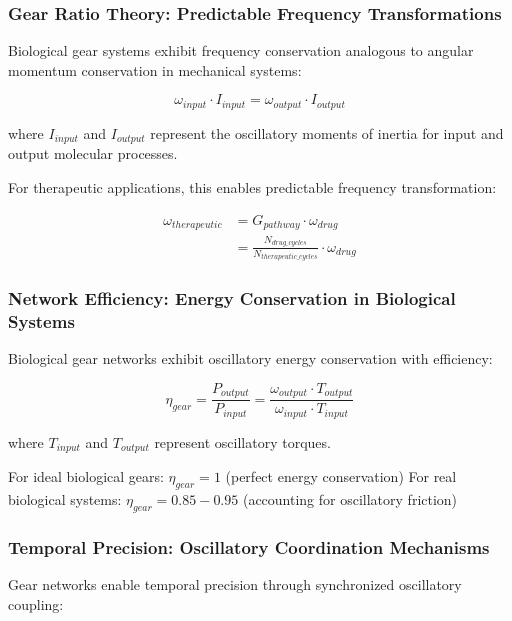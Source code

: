 \documentclass[12pt,a4paper]{article}
\begin{document}
\subsubsection{Gear Ratio Theory: Predictable Frequency Transformations}

Biological gear systems exhibit frequency conservation analogous to angular momentum conservation in mechanical systems:

\begin{equation}
\omega_{input} \cdot I_{input} = \omega_{output} \cdot I_{output}
\end{equation}

where $I_{input}$ and $I_{output}$ represent the oscillatory moments of inertia for input and output molecular processes.

For therapeutic applications, this enables predictable frequency transformation:

\begin{align}
\omega_{therapeutic} &= G_{pathway} \cdot \omega_{drug} \\
&= \frac{N_{drug\_cycles}}{N_{therapeutic\_cycles}} \cdot \omega_{drug}
\end{align}

\subsubsection{Network Efficiency: Energy Conservation in Biological Systems}

Biological gear networks exhibit oscillatory energy conservation with efficiency:

\begin{equation}
\eta_{gear} = \frac{P_{output}}{P_{input}} = \frac{\omega_{output} \cdot T_{output}}{\omega_{input} \cdot T_{input}}
\end{equation}

where $T_{input}$ and $T_{output}$ represent oscillatory torques.

For ideal biological gears: $\eta_{gear} = 1$ (perfect energy conservation)
For real biological systems: $\eta_{gear} = 0.85 - 0.95$ (accounting for oscillatory friction)

\subsubsection{Temporal Precision: Oscillatory Coordination Mechanisms}

Gear networks enable temporal precision through synchronized oscillatory coupling:
\end{document}
